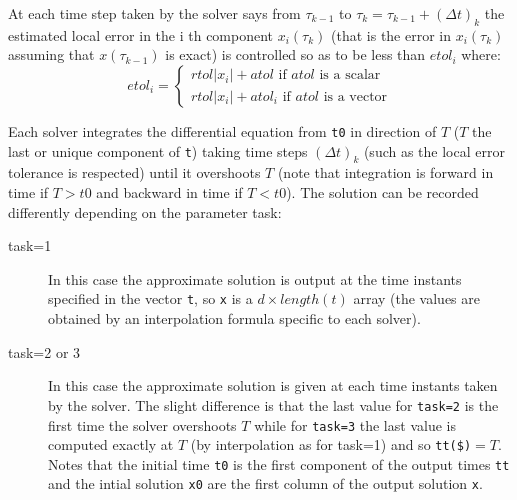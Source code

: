 \begin{mandescription}
At each time step taken by the solver says from $\tau_{k-1}$ to  $\tau_k = \tau_{k-1} + (\Delta t)_k$
the estimated local error in the i th component $x_i(\tau_k)$ (that is the error in 
$x_i(\tau_k)$ assuming that $x(\tau_{k-1})$ is exact) is controlled so as to be less 
than $etol_i$ where:
$$
etol_i =
\left\{
\begin{array}{l}
 rtol | x_i | + atol  \mbox{ if } atol \mbox { is a scalar} \\
 rtol | x_i | + atol_i  \mbox{ if } atol \mbox { is a vector}
\end{array}
\right.
$$

Each solver integrates the differential equation from \verb+t0+ in
direction of $T$ ($T$ the last or unique component of \verb+t+) taking 
time steps $(\Delta t)_k$ (such as the local error tolerance is respected) 
until it overshoots $T$ (note that integration is forward in time if 
$T>t0$ and backward in time if $T<t0$). The solution can be recorded
differently depending on the parameter task:
\begin{description}
\item[task=1] In this case the approximate solution is output
at the time instants specified in the vector {\tt t}, so \verb+x+ is
a $d \times length(t)$ array (the values are obtained by an interpolation
formula specific to each solver).

\item[task=2 or 3] In this case the approximate solution is given at each
time instants taken by the solver. The slight difference is that the last
value for \verb+task=2+ is the first time the solver overshoots $T$
while for \verb+task=3+ the last value is computed exactly at  $T$
(by interpolation as for task=1) and so \verb+tt($)+$=T$. Notes that the 
initial time \verb+t0+ is the first component of the output times \verb+tt+
and the intial solution \verb+x0+ are the first column of the output
solution \verb+x+.    
\end{description}


\end{mandescription}
